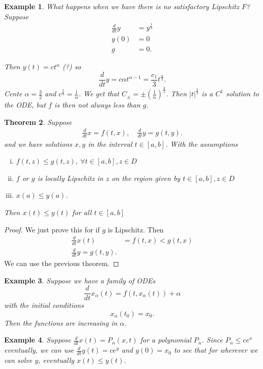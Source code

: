 \documentclass{tufte-handout}
\newtheorem{thm}{Theorem}[subsection]
\newtheorem{ex}[thm]{Example}
\theoremstyle{definition}
\begin{document}
\begin{ex}
	What happens when we have there is no satisfactory Lipschitz $F$? Suppose
	\begin{align*}
		\frac{d}{dt}y &= y^{\frac{1}{3}} \\
		y(0) &= 0 \\
		g &= 0
	.\end{align*}

	Then $y(t) = ct^{\alpha}$ (?) so \[
		\frac{d}{dt}y = c\alpha t^{\alpha-1} = \frac{c_1}{3} t^{\frac{\alpha}{3}}
	.\] Cente $\alpha = \frac{3}{2}$ and $c^{\frac{2}{3}} = \frac{1}{\alpha}$. 
	We get that $C_{\pm} = \pm (\frac{1}{\alpha})^{\frac{3}{2}}$. Then $\left| t \right|^{\frac{3}{2}}$ is a $C^1$ solution to the ODE, but $f$ is then not always less than $g$.
\end{ex}

\begin{thm}
	Suppose
	\begin{align*}
		\frac{d}{dt}x = f(t,x),\quad \frac{d}{dt}y = g(t,y)
	.\end{align*} and we have solutions $x,y$ in the interval $t \in [a,b]$.
	With the assumptions 
	\begin{enumerate}[(i)]
		\item $f(t,z) \le g(t,z), \ \forall  t \in [a,b], z \in D$ 
		\item $f$ or $g$ is locally Lipschitz in $z$ on the region given by $t \in [a,b],z \in D$
		\item $x(a) \le y(a)$.
	\end{enumerate}
	Then $x(t) \le y(t)$ for all $t \in [a,b]$
\end{thm}

\begin{proof}
	We just prove this for if $g$ is Lipschitz. Then 
	\begin{align*}
		\frac{d}{dt}x(t) &= f(t,x) < g(t,x) \\
		\frac{d}{dt} y = g(t,y)	
	.\end{align*}
	We can use the previous theorem.
\end{proof}

\begin{ex}
	Suppose we have a family of ODEs \[
		\frac{d}{dt}x_\alpha(t) = f\left( t,x_\alpha(t) \right) + \alpha 
	\] with the initial conditions \[
		x_\alpha(t_0) = x_0
	.\] Then the functions are increasing in $\alpha$.
\end{ex}

\begin{ex}
	Suppose $\frac{d}{dt}x(t) = P_n(x,t)$ for a polynomial $P_n$. Since $P_n \le c e^x$ eventually, we can use $\frac{d}{dt}y(t) = c e^{y}$ and $y(0) = x_0$ to see that for wherever we can solve $y$, eventually $x(t) \le y(t)$.
\end{ex}
\end{document}
